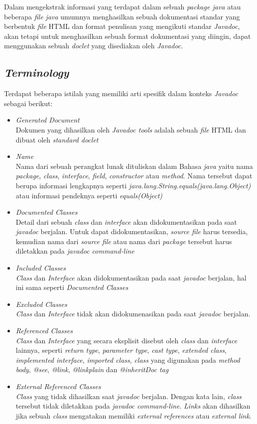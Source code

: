 Dalam mengekstrak informasi yang terdapat dalam sebuah {\it package java} atau beberapa {\it file java} umumnya menghasilkan sebuah dokumentasi standar yang berbentuk {\it file} HTML dan format penulisan yang mengikuti standar {\it Javadoc}, akan tetapi untuk menghasilkan sebuah format dokumentasi yang diingin, dapat menggunakan sebuah {\it doclet} yang disediakan oleh {\it Javadoc}.

\subsection{\textit{Terminology}}
\label{sec:terminology}
Terdapat beberapa istilah yang memiliki arti spesifik dalam konteks {\it Javadoc} sebagai berikut:
\begin{itemize}
	\item {\it Generated Document}\\
	Dokumen yang dihasilkan oleh {\it Javadoc tools} adalah sebuah {\it file} HTML dan dibuat oleh {\it standard doclet}
	\item {\it Name}\\
	Nama dari sebuah perangkat lunak dituliskan dalam Bahasa {\it java} yaitu nama {\it package}, {\it class}, {\it interface}, {\it field}, {\it constructor} atau {\it method}. Nama tersebut dapat berupa informasi lengkapnya seperti {\it java.lang.String.equals(java.lang.Object)} atau informasi pendeknya seperti {\it equals(Object)}
	\item {\it Documented Classes}\\
	Detail dari sebuah {\it class} dan {\it interface} akan didokumentasikan pada saat {\it javadoc} berjalan. Untuk dapat didokumentasikan, {\it source file} harus tersedia, kemudian nama dari {\it source file} atau nama dari {\it package} tersebut harus diletakkan pada {\it javadoc command-line}
	\item {\it Included Classes}\\
	{\it Class} dan {\it Interface} akan didokumentasikan pada saat {\it javadoc} berjalan, hal ini sama seperti {\it Documented Classes}
	\item {\it Excluded Classes}\\
	{\it Class} dan {\it Interface} tidak akan didokumenasikan pada saat {\it javadoc} berjalan.
	\item {\it Referenced Classes}\\
	{\it Class} dan {\it Interface} yang secara eksplisit disebut oleh {\it class} dan {\it interface} lainnya, seperti {\it return type}, {\it parameter type}, {\it cast type}, {\it extended class}, {\it implemented interface}, {\it imported class}, {\it class} yang digunakan pada {\it method body}, {\it @see}, {\it {@link}}, {\it {@linkplain}} dan {\it {@inheritDoc} tag} 
	\item {\it External Referenced Classes}\\
	{\it Class} yang tidak dihasilkan saat {\it javadoc} berjalan. Dengan kata lain, {\it class} tersebut tidak diletakkan pada {\it javadoc command-line}. {\it Links} akan dihasilkan jika sebuah {\it class} mengatakan memiliki {\it external references} atau {\it external link}.
\end{itemize}

